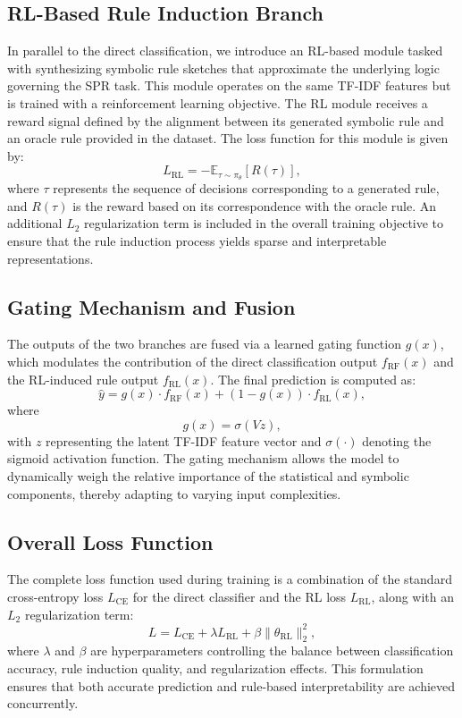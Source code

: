 \documentclass{article}
\begin{document}
\subsection{RL-Based Rule Induction Branch}
In parallel to the direct classification, we introduce an RL-based module tasked with synthesizing symbolic rule sketches that approximate the underlying logic governing the SPR task. This module operates on the same TF-IDF features but is trained with a reinforcement learning objective. The RL module receives a reward signal defined by the alignment between its generated symbolic rule and an oracle rule provided in the dataset. The loss function for this module is given by:
\[
L_{\text{RL}} = -\mathbb{E}_{\tau \sim \pi_{\theta}} \left[ R(\tau) \right],
\]
where \( \tau \) represents the sequence of decisions corresponding to a generated rule, and \( R(\tau) \) is the reward based on its correspondence with the oracle rule. An additional \(L_2\) regularization term is included in the overall training objective to ensure that the rule induction process yields sparse and interpretable representations.

\subsection{Gating Mechanism and Fusion}
The outputs of the two branches are fused via a learned gating function \( g(x) \), which modulates the contribution of the direct classification output \( f_{\text{RF}}(x) \) and the RL-induced rule output \( f_{\text{RL}}(x) \). The final prediction is computed as:
\[
\hat{y} = g(x) \cdot f_{\text{RF}}(x) + \left(1 - g(x)\right) \cdot f_{\text{RL}}(x),
\]
where
\[
g(x) = \sigma\left(Vz\right),
\]
with \( z \) representing the latent TF-IDF feature vector and \( \sigma(\cdot) \) denoting the sigmoid activation function. The gating mechanism allows the model to dynamically weigh the relative importance of the statistical and symbolic components, thereby adapting to varying input complexities.

\subsection{Overall Loss Function}
The complete loss function used during training is a combination of the standard cross-entropy loss \( L_{\text{CE}} \) for the direct classifier and the RL loss \( L_{\text{RL}} \), along with an \(L_2\) regularization term:
\[
L = L_{\text{CE}} + \lambda L_{\text{RL}} + \beta \|\theta_{\text{RL}}\|_2^2,
\]
where \(\lambda\) and \(\beta\) are hyperparameters controlling the balance between classification accuracy, rule induction quality, and regularization effects. This formulation ensures that both accurate prediction and rule-based interpretability are achieved concurrently.
\end{document}
